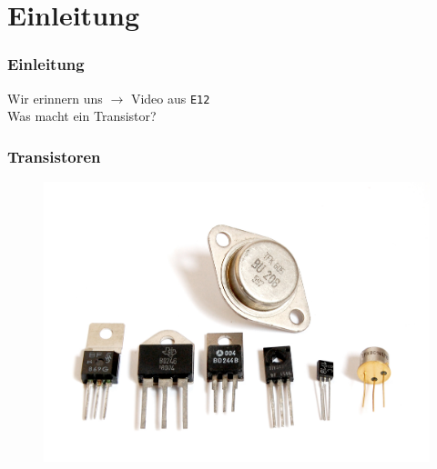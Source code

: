 

\subtitle{Technik Klasse E 13: \\
  Transistor \& Verstärker \\[2em]}
\date{Stand 28.11.2016}



\section*{Einleitung}
\begin{frame}
  \frametitle{Einleitung}
  Wir erinnern uns $\rightarrow$ Video aus \texttt{E12}\\[1.5em]
  Was macht ein Transistor?
\end{frame}

\begin{frame}
  \frametitle{Transistoren}
  \begin{figure}
    \includegraphics[width=\textwidth,height=.65\textheight,keepaspectratio]{e13/Transistors-white.jpg}
  \end{figure}
\end{frame}


